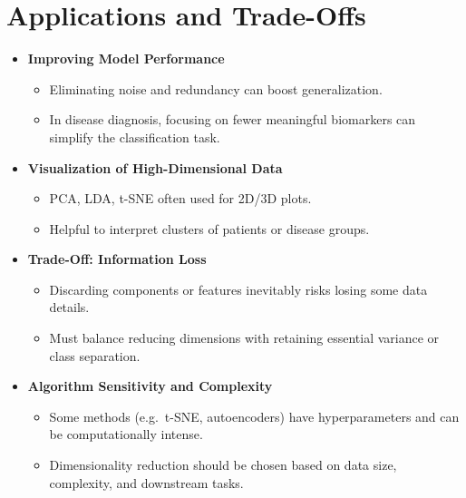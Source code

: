 \documentclass[10pt]{article}
\begin{document}
\section{Applications and Trade-Offs}
\begin{itemize}
    \item \textbf{Improving Model Performance}
    \begin{itemize}
        \item Eliminating noise and redundancy can boost generalization.
        \item In disease diagnosis, focusing on fewer meaningful biomarkers can simplify the classification task.
    \end{itemize}
    \item \textbf{Visualization of High-Dimensional Data}
    \begin{itemize}
        \item PCA, LDA, t-SNE often used for 2D/3D plots.
        \item Helpful to interpret clusters of patients or disease groups.
    \end{itemize}
    \item \textbf{Trade-Off: Information Loss}
    \begin{itemize}
        \item Discarding components or features inevitably risks losing some data details.
        \item Must balance reducing dimensions with retaining essential variance or class separation.
    \end{itemize}
    \item \textbf{Algorithm Sensitivity and Complexity}
    \begin{itemize}
        \item Some methods (e.g.\ t-SNE, autoencoders) have hyperparameters and can be computationally intense.
        \item Dimensionality reduction should be chosen based on data size, complexity, and downstream tasks.
    \end{itemize}
\end{itemize}
\end{document}
